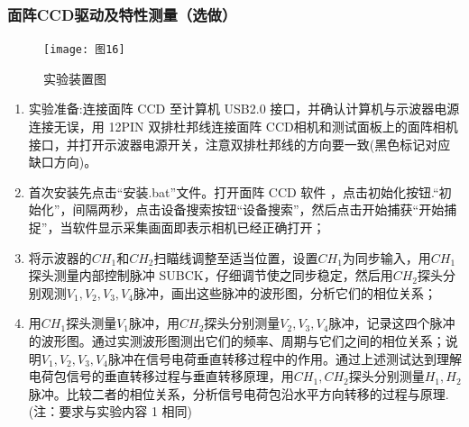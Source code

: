 \documentclass{ctexart}
\begin{document}
\subsubsection{面阵CCD驱动及特性测量（选做）}
\begin{figure}[H]
	\centering
	\texttt{[image: 图16]}
	\caption{实验装置图}\label{picture16}
\end{figure}
\begin{enumerate}[(1)]
\item  实验准备:连接面阵 CCD 至计算机 USB2.0 接口，并确认计算机与示波器电源连接无误，用 12PIN 双排杜邦线连接面阵 CCD相机和测试面板上的面阵相机接口，并打开示波器电源开关，注意双排杜邦线的方向要一致(黑色标记对应缺口方向)。
\item 首次安装先点击“安装.bat”文件。打开面阵 CCD 软件 ，点击初始化按钮.“初始化”，间隔两秒，点击设备搜索按钮“设备搜索”，然后点击开始捕获“开始捕捉”，当软件显示采集画面即表示相机已经正确打开；
\item 将示波器的$CH_1$和$CH_2$扫瞄线调整至适当位置，设置$CH_1$为同步输入，用$CH_1$探头测量内部控制脉冲 SUBCK，仔细调节使之同步稳定，然后用$CH_2$探头分别观测$V_1,V_2,V_3,V_4$脉冲，画出这些脉冲的波形图，分析它们的相位关系；
\item 用$CH_1$探头测量$V_1$脉冲，用$CH_2$探头分别测量$V_2,V_3,V_4$脉冲，记录这四个脉冲的波形图。通过实测波形图测出它们的频率、周期与它们之间的相位关系；说明$V_1,V_2,V_3,V_4$脉冲在信号电荷垂直转移过程中的作用。通过上述测试达到理解电荷包信号的垂直转移过程与垂直转移原理，用$CH_1,CH_2$探头分别测量$H_1,H_2$脉冲。比较二者的相位关系，分析信号电荷包沿水平方向转移的过程与原理.(注：要求与实验内容 1 相同)
\end{enumerate}
	
\end{document}
